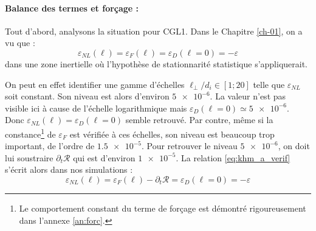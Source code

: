  \paragraph{Balance des termes et forçage :  } 
 
 Tout d'abord, analysons la situation pour CGL1. Dans le Chapitre \ref{ch-01}, on a vu que : 
 \begin{equation}
     \label{eq:khm_a_verif} \varepsilon_{NL}(\boldsymbol{\ell})  = \varepsilon_{F}(\boldsymbol{\ell}) = \varepsilon_{D}(\boldsymbol{\ell} = 0) = - \varepsilon
 \end{equation}
  dans une zone inertielle où l'hypothèse de stationnarité statistique s'appliquerait. 
  
  On peut en effet identifier une gamme d'échelles $\ell_{\perp}/d_i \in \left[ \num{1}; \num{20}\right]$ telle que $\varepsilon_{NL}$ soit constant. Son niveau est alors d'environ $\num{5e-6}$. La valeur n'est pas visible ici à cause de l'échelle logarithmique mais $\varepsilon_{D}(\boldsymbol{\ell} = 0) \simeq \num{5e-6}$. Donc $\varepsilon_{NL}(\boldsymbol{\ell})  =  \varepsilon_{D}(\boldsymbol{\ell} = 0)$ semble retrouvé. Par contre, même si la constance\footnote{ Le comportement constant du terme de forçage est démontré rigoureusement dans l'annexe \ref{an:forc}.} de $\varepsilon_{F}$ est vérifiée à ces échelles, son niveau est beaucoup trop important, de l'ordre de $ \num{1.5e-5}$. Pour retrouver le niveau $\num{5e-6}$, on doit lui soustraire $\partial_t \mathcal{R}$ qui est d'environ $ \num{1e-5}$. La relation \eqref{eq:khm_a_verif} s'écrit alors dans nos simulations : 
  \begin{equation}
     \label{eq:khm_b_verif} \varepsilon_{NL}(\boldsymbol{\ell})  = \varepsilon_{F}(\boldsymbol{\ell}) - \partial_t \mathcal{R} = \varepsilon_{D}(\boldsymbol{\ell} = 0) = - \varepsilon
 \end{equation}
 
